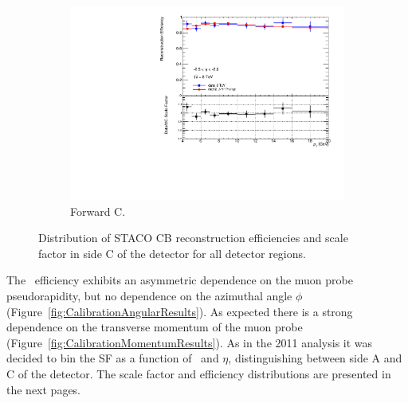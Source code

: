 \begin{figure}[htbp]
  \begin{subfigure}[b]{0.45\textwidth}
    \includegraphics[width=\textwidth]{PartCalibration2012/Plots/SFPlots/Forward_C_reco.pdf}
    \caption{Forward C.} \label{fig:CalibrationRecoSFForwardC}
  \end{subfigure}
  \caption{Distribution of STACO CB reconstruction efficiencies and scale factor in side C of the detector for all detector regions.}
  \label{fig:RecoEffSideC}
\end{figure}

The \xsm\ efficiency exhibits an asymmetric dependence on the muon probe pseudorapidity, but no dependence on the azimuthal angle $\phi$ (Figure~\ref{fig:CalibrationAngularResults}). As expected there is a strong dependence on the transverse momentum of the muon probe (Figure~\ref{fig:CalibrationMomentumResults}). As in the 2011 analysis it was decided to bin the SF as a function of \pt\ and $\eta$, distinguishing between side A and C of the detector. The scale factor and efficiency distributions are presented in the next pages. 

